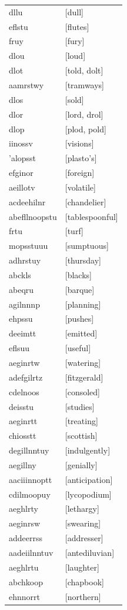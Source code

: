 \documentclass{article}
\begin{document}
\begin{tabular}{ll}
dllu & [dull] \\
eflstu & [flutes] \\
fruy & [fury] \\
dlou & [loud] \\
dlot & [told, dolt] \\
aamrstwy & [tramways] \\
dlos & [sold] \\
dlor & [lord, drol] \\
dlop & [plod, pold] \\
iinossv & [visions] \\
'alopsst & [plasto's] \\
efginor & [foreign] \\
aeillotv & [volatile] \\
acdeehilnr & [chandelier] \\
abefllnoopstu & [tablespoonful] \\
frtu & [turf] \\
mopsstuuu & [sumptuous] \\
adhrstuy & [thursday] \\
abckls & [blacks] \\
abeqru & [barque] \\
agilnnnp & [planning] \\
ehpssu & [pushes] \\
deeimtt & [emitted] \\
eflsuu & [useful] \\
aeginrtw & [watering] \\
adefgilrtz & [fitzgerald] \\
cdelnoos & [consoled] \\
deisstu & [studies] \\
aeginrtt & [treating] \\
chiosstt & [scottish] \\
degillnntuy & [indulgently] \\
aegillny & [genially] \\
aaciiinnoptt & [anticipation] \\
cdilmoopuy & [lycopodium] \\
aeghlrty & [lethargy] \\
aeginrsw & [swearing] \\
addeerrss & [addresser] \\
aadeiilnntuv & [antediluvian] \\
aeghlrtu & [laughter] \\
abchkoop & [chapbook] \\
ehnnorrt & [northern] \\

\end{tabular}
\end{document}
